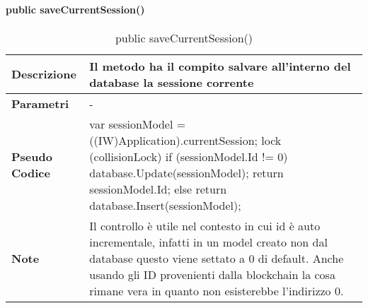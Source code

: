 \paragraph{public saveCurrentSession()}
\begin{center}
    \begin{longtable}{|p{3cm}|p{9cm}|}%
    \caption{public saveCurrentSession()}
    \label{tab:public-savecurrentsession}
    \endfirsthead
    \endhead
    \hline
    \textbf{Descrizione} & Il metodo ha il compito salvare all’interno del database la sessione corrente\\
    \hline
    \textbf{Parametri} &      
    -
    \\
    \hline
    \textbf{Pseudo Codice} & 
    var sessionModel = ((IW)Application).currentSession;\newline
    lock (collisionLock)\newline
    {\newline
        if (sessionModel.Id != 0)\newline
        {\newline
            database.Update(sessionModel);\newline
            return sessionModel.Id;\newline
        }\newline
        else\newline
        {\newline
            return database.Insert(sessionModel);\newline
        }\newline
    }\newline
    \\
    \hline
    \textbf{Note} & 
    Il controllo è utile nel contesto in cui id è auto incrementale, infatti in un model creato non dal database questo viene settato a 0 di default. Anche usando gli ID provenienti dalla blockchain la cosa rimane vera in quanto non esisterebbe l’indirizzo 0.
    \\
    \hline
    \end{longtable}
    \end{center}


